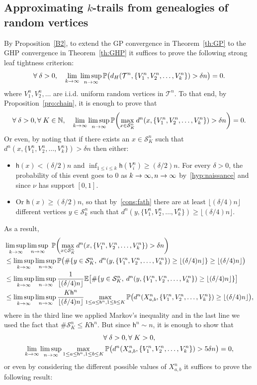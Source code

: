 \documentclass[AHL,Unicode,published]{cedram}
\newcommand{\proba}[1]{\mathbb{P}\left(#1\right)}
\newcommand{\N}{\mathbb{N}}
\newcommand{\E}{\mathbb{E}}
\newcommand{\1}{\mathbbm{1}}
\newcommand{\trail}{\mathcal{S}}
\newcommand{\T}{\mathcal{T}}
\newcommand{\h}{\mathsf{h}}
\let\originalleft\left
\let\originalright\right
\renewcommand{\left}{\mathopen{}\mathclose\bgroup\originalleft}
\renewcommand{\right}{\aftergroup\egroup\originalright}
\renewcommand*{\to}{\mathchoice{\longrightarrow}{\rightarrow}{\rightarrow}{\rightarrow}}
\let\oldforall\forall
\renewcommand*{\forall}{\mathrel{\oldforall}}
\begin{document}
\subsection{Approximating \texorpdfstring{$k$}{k}-trails from genealogies of random vertices}
By Proposition~\ref{B2}, to extend the GP convergence in Theorem~\ref{th:GP} to the GHP convergence in Theorem~\ref{th:GHP} it suffices to prove the following strong leaf tightness criterion:
\[
\forall \delta>0,\quad \lim_{k\to \infty} \limsup_{n\to \infty} \mathbb{P}\bigl(d_H(\T^n,\{V^n_1,V^n_2,\dots,V^n_k\})>\delta n \bigr) = 0.
\]
where $V^n_1,V^n_2,\dots$ are i.i.d. uniform random vertices in $\T^n$. To that end, by Proposition~\ref{pro:chain}, it is enough to prove that
\[
\forall \delta>0, \forall K\in \N, \quad \lim_{k\to \infty} \limsup_{n\to \infty} \proba{\max_{x\in \trail_K^n} d^n(x,\{V^n_1,V^n_2,\dots,V^n_k\})>\delta n} = 0.
\]
Or even, by noting that if there exists an $x\in \trail_K^n$ such that $d^n(x,\{V^n_1,V^n_2,\dots,V^n_k\})>\delta n$ then either:
\begin{itemize}
\item $\h(x)<(\delta/2)n$ and $\inf_{1\leq i \leq k} \h(V^n_i)\ge (\delta/2) n$. For every $\delta>0$, the probability of this event goes to $0$ as $k\to \infty,n\to \infty$ by~\ref{hyp:naissance} and since $\nu$ has support $[0,1]$.
\item Or $\h(x)\ge(\delta/2)n$, so that by~\ref{cons:fath} there are at least $\lfloor (\delta/4) n\rfloor$ different vertices $y\in \trail_k^n$ such that $d^n(y,\{V^n_1,V^n_2,\dots,V^n_k\})\ge \lfloor (\delta/4) n \rfloor$.
\end{itemize}
As a result,
\begin{align*}
&\limsup_{k\to \infty} \limsup_{n\to \infty} \ \proba{\max_{x\in \trail_K^n} d^n(x,\{V^n_1,V^n_2,\dots,V^n_k\})>\delta n}\\ &\le
\limsup_{k\to \infty} \limsup_{n\to \infty} \mathbb{P}\bigl( \# \left\{y \in \trail_K^n,\: d^n(y,\{V^n_1,V^n_2,\dots,V^n_k\})\ge\lfloor (\delta/4)n \rfloor \right\} \ge \lfloor (\delta/4)n \rfloor\bigr) \\
&\le \limsup_{k\to \infty} \limsup_{n\to \infty} \frac{1}{\lfloor (\delta/4)n \rfloor} \E\bigl[\# \{y \in \trail_K^n, \: d^n(y,\{V^n_1,V^n_2,\dots,V^n_k\})\ge\lfloor (\delta/4)n \rfloor \} \bigr] \\
&\le \limsup_{k\to \infty} \limsup_{n\to \infty} \frac{K \h^n}{\lfloor (\delta/4)n \rfloor} \max_{1\leq a\leq \h^n,1\leq b\leq K} \proba{d^n(X^n_{a,b},\{V^n_1,V^n_2,\dots,V^n_k\})\ge \lfloor (\delta/4) n\rfloor},
\end{align*}
where in the third line we applied Markov's inequality and in the last line we used the fact that $\#\trail_K^n \leq K \h^n$. But since $\h^n \sim n$, it is enough to show that
\begin{multline*}
\forall \delta>0, \forall K>0,  \\
\lim_{k\to \infty} \limsup_{n\to \infty} \max_{1\leq a\leq \h^n,1\leq b\leq K} \proba{d^n(X^n_{a,b},\{V^n_1,V^n_2,\dots,V^n_k\})>{5}\delta n} = 0,
\end{multline*}
or even by considering the different possible values of $X^n_{a,b}$ it suffices to prove the following result:
\end{document}
